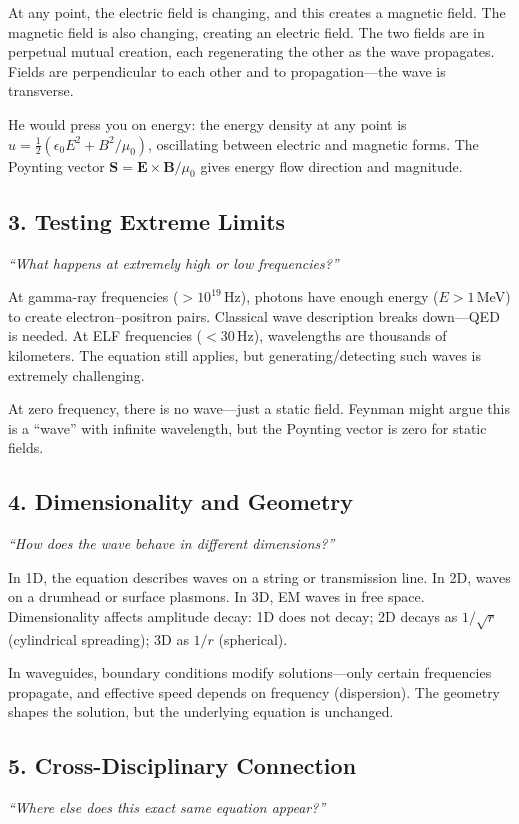 At any point, the electric field is changing, and this creates a magnetic field. The magnetic field is also changing, creating an electric field. The two fields are in perpetual mutual creation, each regenerating the other as the wave propagates. Fields are perpendicular to each other and to propagation---the wave is transverse.

He would press you on energy: the energy density at any point is $u = \frac{1}{2}(\epsilon_0 E^2 + B^2/\mu_0)$, oscillating between electric and magnetic forms. The Poynting vector $\mathbf{S} = \mathbf{E} \times \mathbf{B}/\mu_0$ gives energy flow direction and magnitude.

\subsection*{3. Testing Extreme Limits}
\textit{``What happens at extremely high or low frequencies?''}

At gamma-ray frequencies ($> 10^{19}$\,Hz), photons have enough energy ($E > 1$\,MeV) to create electron--positron pairs. Classical wave description breaks down---QED is needed. At ELF frequencies ($< 30$\,Hz), wavelengths are thousands of kilometers. The equation still applies, but generating/detecting such waves is extremely challenging.

At zero frequency, there is no wave---just a static field. Feynman might argue this is a ``wave'' with infinite wavelength, but the Poynting vector is zero for static fields.

\subsection*{4. Dimensionality and Geometry}
\textit{``How does the wave behave in different dimensions?''}

In 1D, the equation describes waves on a string or transmission line. In 2D, waves on a drumhead or surface plasmons. In 3D, EM waves in free space. Dimensionality affects amplitude decay: 1D does not decay; 2D decays as $1/\sqrt{r}$ (cylindrical spreading); 3D as $1/r$ (spherical).

In waveguides, boundary conditions modify solutions---only certain frequencies propagate, and effective speed depends on frequency (dispersion). The geometry shapes the solution, but the underlying equation is unchanged.

\subsection*{5. Cross-Disciplinary Connection}
\textit{``Where else does this exact same equation appear?''}

